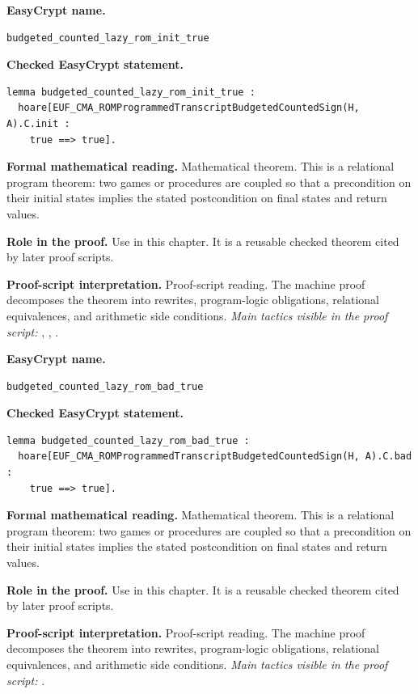 \begin{formaltheorem}
\noindent\textbf{EasyCrypt name.}
\begin{lstlisting}[language=EasyCrypt,basicstyle=\ttfamily\scriptsize]
budgeted_counted_lazy_rom_init_true
\end{lstlisting}
\noindent\textbf{Checked EasyCrypt statement.}
\begin{lstlisting}[language=EasyCrypt,basicstyle=\ttfamily\scriptsize]
lemma budgeted_counted_lazy_rom_init_true :
  hoare[EUF_CMA_ROMProgrammedTranscriptBudgetedCountedSign(H, A).C.init :
    true ==> true].
\end{lstlisting}
\noindent\textbf{Formal mathematical reading.}
Mathematical theorem. This is a relational program theorem: two games or procedures are coupled so that a precondition on their initial states implies the stated postcondition on final states and return values.

\noindent\textbf{Role in the proof.}
Use in this chapter. It is a reusable checked theorem cited by later proof scripts.

\noindent\textbf{Proof-script interpretation.}
Proof-script reading. The machine proof decomposes the theorem into rewrites, program-logic obligations, relational equivalences, and arithmetic side conditions.
\emph{Main tactics visible in the proof script:} , , .

\end{formaltheorem}

\begin{formaltheorem}
\noindent\textbf{EasyCrypt name.}
\begin{lstlisting}[language=EasyCrypt,basicstyle=\ttfamily\scriptsize]
budgeted_counted_lazy_rom_bad_true
\end{lstlisting}
\noindent\textbf{Checked EasyCrypt statement.}
\begin{lstlisting}[language=EasyCrypt,basicstyle=\ttfamily\scriptsize]
lemma budgeted_counted_lazy_rom_bad_true :
  hoare[EUF_CMA_ROMProgrammedTranscriptBudgetedCountedSign(H, A).C.bad :
    true ==> true].
\end{lstlisting}
\noindent\textbf{Formal mathematical reading.}
Mathematical theorem. This is a relational program theorem: two games or procedures are coupled so that a precondition on their initial states implies the stated postcondition on final states and return values.

\noindent\textbf{Role in the proof.}
Use in this chapter. It is a reusable checked theorem cited by later proof scripts.

\noindent\textbf{Proof-script interpretation.}
Proof-script reading. The machine proof decomposes the theorem into rewrites, program-logic obligations, relational equivalences, and arithmetic side conditions.
\emph{Main tactics visible in the proof script:} .

\end{formaltheorem}

